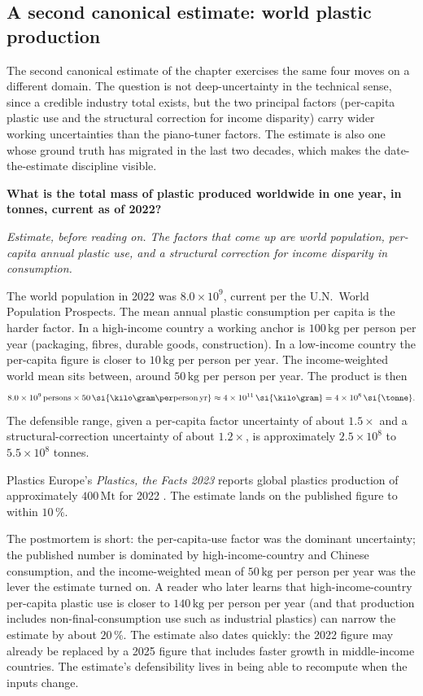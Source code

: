 \subsection{A second canonical estimate: world plastic production}

The second canonical estimate of the chapter exercises the same four
moves on a different domain. The question is not deep-uncertainty in
the technical sense, since a credible industry total exists, but the
two principal factors (per-capita plastic use and the structural
correction for income disparity) carry wider working uncertainties
than the piano-tuner factors. The estimate is also one whose ground
truth has migrated in the last two decades, which makes the
date-the-estimate discipline visible.

\begin{estimation}
\textbf{What is the total mass of plastic produced worldwide in one
year, in tonnes, current as of 2022?}

\smallskip
\textit{Estimate, before reading on. The factors that come up are
world population, per-capita annual plastic use, and a structural
correction for income disparity in consumption.}

\smallskip
The world population in 2022 was $8.0 \times 10^{9}$, current per
the U.N.\ World Population Prospects. The mean annual plastic
consumption per capita is the harder factor. In a high-income
country a working anchor is $100 \,\si{\kilogram}$ per person per
year (packaging, fibres, durable goods, construction). In a
low-income country the per-capita figure is closer to
$10 \,\si{\kilogram}$ per person per year. The income-weighted
world mean sits between, around $50 \,\si{\kilogram}$ per person
per year. The product is then
\[
8.0 \times 10^{9} \,\text{persons}
\times 50 \,\si{\kilo\gram\per\text{person\,yr}}
\approx 4 \times 10^{11} \,\si{\kilo\gram}
= 4 \times 10^{8} \,\si{\tonne}.
\]
The defensible range, given a per-capita factor uncertainty of about
$1.5\times$ and a structural-correction uncertainty of about
$1.2\times$, is approximately $2.5 \times 10^{8}$ to $5.5 \times
10^{8}$ tonnes.

Plastics Europe's \emph{Plastics, the Facts 2023} reports global
plastics production of approximately $400 \,\si{\mega\tonne}$ for
2022 \cite{data:ch09-plastics-europe-2023}. The estimate lands on
the published figure to within $10\,\%$.

The postmortem is short: the per-capita-use factor was the
dominant uncertainty; the published number is dominated by
high-income-country and Chinese consumption, and the income-weighted
mean of $50 \,\si{\kilo\gram}$ per person per year was the lever
the estimate turned on. A reader who later learns that
high-income-country per-capita plastic use is closer to
$140 \,\si{\kilo\gram}$ per person per year (and that production
includes non-final-consumption use such as industrial plastics) can
narrow the estimate by about $20\,\%$. The estimate also dates
quickly: the 2022 figure may already be replaced by a 2025 figure
that includes faster growth in middle-income countries. The
estimate's defensibility lives in being able to recompute when the
inputs change.
\end{estimation}

